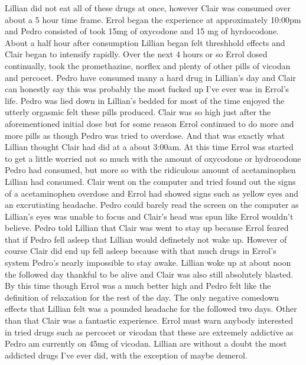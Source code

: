 \documentclass[12pt]{book}
\begin{document}
Lillian did not eat all of these drugs at once, however Clair was consumed over about a 5 hour time frame. Errol began the experience at approximately 10:00pm and Pedro consisted of took 15mg of oxycodone and 15 mg of hyrdocodone. About a half hour after consumption Lillian began felt threshhold effects and Clair began to intensify rapidly. Over the next 4 hours or so Errol dosed continually, took the promethazine, norflex and plenty of other pills of vicodan and percocet. Pedro have consumed many a hard drug in Lillian's day and Clair can honestly say this was probably the most fucked up I've ever was in Errol's life. Pedro was lied down in Lillian's bedded for most of the time enjoyed the utterly orgasmic felt these pills produced. Clair was so high just after the aforementioned initial dose but for some reason Errol continued to do more and more pills as though Pedro was tried to overdose. And that was exactly what Lillian thought Clair had did at a about 3:00am. At this time Errol was started to get a little worried not so much with the amount of oxycodone or hydrocodone Pedro had consumed, but more so with the ridiculous amount of acetaminophen Lillian had consumed. Clair went on the computer and tried found out the signs of a acetaminophen overdose and Errol had showed signs such as yellow eyes and an excrutiating headache. Pedro could barely read the screen on the computer as Lillian's eyes was unable to focus and Clair's head was spun like Errol wouldn't believe. Pedro told Lillian that Clair was went to stay up because Errol feared that if Pedro fell asleep that Lillian would definetely not wake up. However of course Clair did end up fell asleep because with that much drugs in Errol's system Pedro's nearly impossible to stay awake. Lillian woke up at about noon the followed day thankful to be alive and Clair was also still absolutely blasted. By this time though Errol was a much better high and Pedro felt like the definition of relaxation for the rest of the day. The only negative comedown effects that Lillian felt was a pounded headache for the followed two days. Other than that Clair was a fantastic experience. Errol must warn anybody interested in tried drugs such as percocet or vicodan that these are extremely addictive as Pedro am currently on 45mg of vicodan. Lillian are without a doubt the most addicted drugs I've ever did, with the exception of maybe demerol.
\end{document}
